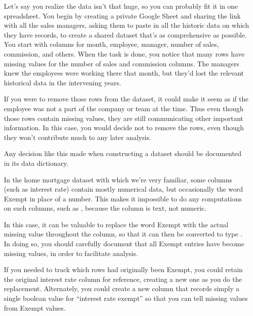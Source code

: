 \documentclass[letterpaper,10pt,english]{sphinxmanual}
\begin{document}
Let’s say you realize the data isn’t that huge, so you can probably fit it in one spreadsheet.  You begin by creating a private Google Sheet and sharing the link with all the sales managers, asking them to paste in all the historic data on which they have records, to create a shared dataset that’s as comprehensive as possible.  You start with columns for month, employee, manager, number of sales, commission, and others.  When the task is done, you notice that many rows have missing values for the number of sales and commission columns.  The managers knew the employees were working there that month, but they’d lost the relevant historical data in the intervening years.

If you were to remove those rows from the dataset, it could make it seem as if the employee was not a part of the company or team at the time.  Thus even though those rows contain missing values, they are still communicating other important information.  In this case, you would decide not to remove the rows, even though they won’t contribute much to any later analysis.

Any decision like this made when constructing a dataset should be documented in its data dictionary.


In the home mortgage dataset with which we’re very familiar, some columns (such as interest rate) contain mostly numerical data, but occasionally the word Exempt in place of a number.  This makes it impossible to do any computations on such columns, such as , because the column is text, not numeric.

In this case, it can be valuable to replace the word Exempt with the actual missing value  throughout the column, so that it can then be converted to type .  In doing so, you should carefully document that all Exempt entries have become missing values, in order to facilitate analysis.  

If you needed to track which rows had originally been Exempt, you could retain the original interest rate column for reference, creating a new one as you do the replacement.  Alternately, you could create a new column that records simply a single boolean value for “interest rate exempt” so that you can tell missing values from Exempt values.
\end{document}
